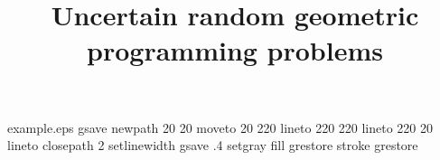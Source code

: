 %
%
%
%
%
\begin{filecontents*}{example.eps}
gsave
newpath
 20 20 moveto
 20 220 lineto
 220 220 lineto
 220 20 lineto
closepath
2 setlinewidth
gsave
 .4 setgray fill
grestore
stroke
grestore
\end{filecontents*}
%
\RequirePackage{fix-cm}
%
\documentclass[smallextended]{svjour3} %
%
\smartqed %
%
\usepackage{graphicx}
\usepackage{etex,bm}
\usepackage{amsmath,amssymb,mathrsfs,mathtools}
\usepackage{amsfonts}
\usepackage{cite}
\usepackage[colorlinks=true,citecolor=blue,linkcolor=blue]{hyperref}
\usepackage[margin=1in]{geometry}
\usepackage{multirow,booktabs}
\usepackage{empheq}
\usepackage{array}
\usepackage{caption}
\usepackage{subcaption}
\usepackage{relsize}
\renewcommand{\figurename}{Figure}
\newcommand\norm[1]{\lVert#1\rVert}
\renewenvironment{proof}{\paragraph{Proof:}}{\hfill$\square$}
\usepackage[utf8]{inputenc}
%
%
%
%
%


\title{Uncertain random geometric programming problems %
}

